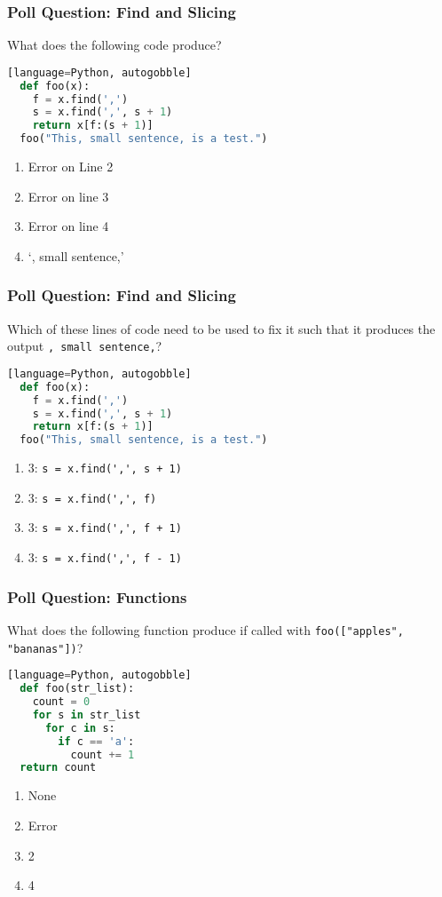 \documentclass{beamer}
\begin{document}
%
%
\begin{frame}[fragile]
  \frametitle{Poll Question: Find and Slicing}
  What does the following code produce?
  \begin{lstlisting}[language=Python, autogobble][language=Python, autogobble]
  def foo(x):
    f = x.find(',')
    s = x.find(',', s + 1)
    return x[f:(s + 1)]
  foo("This, small sentence, is a test.")
  \end{lstlisting}
  \vfill
  \begin{enumerate}[A]
    \item Error on Line 2 
    \item Error on line 3 
    \item Error on line 4
    \item `, small sentence,' 
  \end{enumerate}
\end{frame}

%
%
\begin{frame}[fragile]
  \frametitle{Poll Question: Find and Slicing}
  Which of these lines of code need to be used to fix it such that it produces the output \lstinline|, small sentence,|?
  \begin{lstlisting}[language=Python, autogobble][language=Python, autogobble]
  def foo(x):
    f = x.find(',')
    s = x.find(',', s + 1)
    return x[f:(s + 1)]
  foo("This, small sentence, is a test.")
  \end{lstlisting}
  \vfill
  \begin{enumerate}[A]
    \item 3: \lstinline|s = x.find(',', s + 1)|
    \item 3: \lstinline|s = x.find(',', f)|
    \item 3: \lstinline|s = x.find(',', f + 1)|
    \item 3: \lstinline|s = x.find(',', f - 1)|
  \end{enumerate}
\end{frame}

%
%
\begin{frame}[fragile]
  \frametitle{Poll Question: Functions}
  What does the following function produce if called with \lstinline|foo(["apples", "bananas"])|?
  \begin{lstlisting}[language=Python, autogobble][language=Python, autogobble]
  def foo(str_list):
    count = 0
    for s in str_list
      for c in s:
        if c == 'a':
          count += 1
  return count
  \end{lstlisting}
  \vfill
  \begin{enumerate}[A]
    \item None
    \item Error
    \item 2
    \item 4
  \end{enumerate}
\end{frame}
\end{document}
